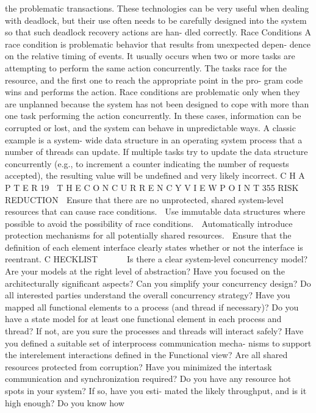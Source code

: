 the problematic transactions. These technologies can be very useful
when dealing with deadlock, but their use often needs to be carefully
designed into the system so that such deadlock recovery actions are han-
dled correctly.
Race Conditions
A race condition is problematic behavior that results from unexpected depen-
dence on the relative timing of events. It usually occurs when two or more
tasks are attempting to perform the same action concurrently. The tasks race
for the resource, and the first one to reach the appropriate point in the pro-
gram code wins and performs the action.
Race conditions are problematic only when they are unplanned because the
system has not been designed to cope with more than one task performing the
action concurrently. In these cases, information can be corrupted or lost, and
the system can behave in unpredictable ways. A classic example is a system-
wide data structure in an operating system process that a number of threads
can update. If multiple tasks try to update the data structure concurrently
(e.g., to increment a counter indicating the number of requests accepted), the
resulting value will be undefined and very likely incorrect.
C H A P T E R 19  T H E C O N C U R R E N C Y V I E W P O I N T
 355
RISK REDUCTION
 Ensure that there are no unprotected, shared system-level resources that
can cause race conditions.
 Use immutable data structures where possible to avoid the possibility of
race conditions.
 Automatically introduce protection mechanisms for all potentially shared
resources.
 Ensure that the definition of each element interface clearly states
whether or not the interface is reentrant.
C HECKLIST
Is there a clear system-level concurrency model?
Are your models at the right level of abstraction? Have you focused on
the architecturally significant aspects?
Can you simplify your concurrency design?
Do all interested parties understand the overall concurrency strategy?
Have you mapped all functional elements to a process (and thread if
necessary)?
Do you have a state model for at least one functional element in each
process and thread? If not, are you sure the processes and threads will
interact safely?
Have you defined a suitable set of interprocess communication mecha-
nisms to support the interelement interactions defined in the Functional
view?
Are all shared resources protected from corruption?
Have you minimized the intertask communication and synchronization
required?
Do you have any resource hot spots in your system? If so, have you esti-
mated the likely throughput, and is it high enough? Do you know how
